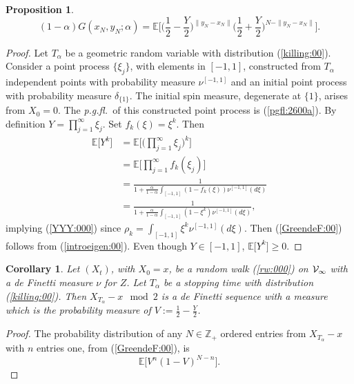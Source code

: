 \documentclass[preprint,11pt]{elsarticle}
\newtheorem{Corollary}{Corollary}
\newtheorem{Proposition}{Proposition}
\theoremstyle{remark}
\def\spin{{[-1,1]}}
\def\pgfl{\emph{p.g.fl.~}}
\begin{document}
{\begin{Proposition}
\begin{equation}
(1-\alpha)G(x_N,y_N;\alpha)= \mathbb{E}\Big [ 
\Big (\frac{1}{2}-\frac{Y}{2}\Big )^{\|y_N-x_N\|}\Big (\frac{1}{2}+\frac{Y}{2}\Big )^{N-\|y_N-x_N\|}\Big ].
\label{GreendeF:00}
\end{equation}
%
\end{Proposition}
\begin{proof}
Let $T_\alpha$ be a geometric random variable with distribution (\ref{killing:00}).
Consider a point process $\{\xi_j\}$, with elements in $[-1,1]$,  constructed from $T_\alpha$ independent points with probability measure $\nu^\spin$ and an initial point process with probability measure $\delta_{\{1\}}$. The initial spin measure,  degenerate at $\{1\}$, arises from $X_0=0$. The \pgfl  of this constructed point process is (\ref{pgfl:2600a}).
By definition $Y= \prod_{j=1}^\infty\xi_j$. Set $f_k(\xi) = \xi^k$. Then
\begin{align*}
\mathbb{E}\big [Y^k\big ] &= \mathbb{E}\Big [\Big (\prod_{j=1}^\infty\xi_j\Big )^k\Big ]\nonumber\\
&= \mathbb{E}\big [\prod_{j=1}^\infty f_k(\xi_j)\big ]\nonumber\\
&=  \frac{1}{1+\frac{\alpha}{1-\alpha}\int_{[-1,1]}(1-f_k(\xi))\nu^{[-1,1]}(d\xi)}\nonumber\\
&=  \frac{1}{1+\frac{\alpha}{1-\alpha}\int_{[-1,1]}(1-\xi^k)\nu^{[-1,1]}(d\xi)},
\end{align*}
implying (\ref{YYY:000})
since $\rho_k = \int_\spin \xi^k\nu^\spin(d\xi)$.
Then (\ref{GreendeF:00}) follows from (\ref{introeigen:00}). Even though $Y \in [-1,1]$, $\mathbb{E}\big [Y^k\big ] \geq 0$.
\end{proof}
%
\begin{Corollary}\label{corrkill:00}
Let $(X_t)$, with $X_0=x$, be a random walk (\ref{rw:000}) on ${\cal V}_\infty$ with a de Finetti measure $\nu$ for $Z$. Let $T_\alpha$ be a stopping time with distribution (\ref{killing:00}). 
Then $X_{T_\alpha} - x \mod 2$ is a de Finetti sequence with a measure which is the probability measure of $V := \frac{1}{2}- \frac{Y}{2}$.
\end{Corollary}
%
\begin{proof} The probability distribution of any $N \in \mathbb{Z}_+$ ordered entries from $X_{T_\alpha}-x$ with $n$ entries one, from (\ref{GreendeF:00}), is 
\[
\mathbb{E}\big [V^n(1-V)^{N-n}\big ].
\]
\end{proof}}
\end{document}
